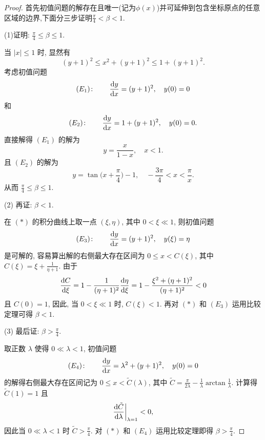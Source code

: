 \begin{proof}
  首先初值问题的解存在且唯一(记为$\phi(x)$)并可延伸到包含坐标原点的任意区域的边界,下面分三步证明$\frac{\pi}{4}<\beta<1$.

  (1)证明: $\frac{\pi}{4}\leq\beta\leq1$.

  当 $|x|\leq 1$ 时, 显然有
  \[(y+1)^2\leq x^2+(y+1)^2\leq1+(y+1)^2.\]
  考虑初值问题
  \[(E_1)\colon\qquad \frac{\mathop{}\!\mathrm{d} y}{\mathop{}\!\mathrm{d} x} = (y+1)^2,\quad y(0)=0\]
  和
  \[(E_2)\colon\qquad \frac{\mathop{}\!\mathrm{d} y}{\mathop{}\!\mathrm{d} x} = 1+(y+1)^2,\quad y(0)=0.\]
  直接解得 $(E_1)$ 的解为
  \[y = \frac{x}{1-x},\quad x<1.\]
  且 $(E_2)$ 的解为
  \[y = \tan\biggl(x+\frac{\pi}{4}\biggr) - 1,\quad -\frac{3\pi}{4} < x < \frac{\pi}{x}.\]
  从而 $\frac{\pi}{4} \leq \beta \leq 1$.

  (2) 再证: $\beta<1$.

  在 $(*)$ 的积分曲线上取一点 $(\xi,\eta)$, 其中 $0<\xi\ll 1$, 则初值问题
  \[(E_3)\colon\qquad \frac{\mathop{}\!\mathrm{d} y}{\mathop{}\!\mathrm{d} x} = (y+1)^2,\quad y(\xi) = \eta\]
  是可解的, 容易算出解的右侧最大存在区间为 $0\leq x < C(\xi)$,
  其中 $C(\xi) = \xi + \frac{1}{\eta+1}$. 由于
  \[\frac{\mathop{}\!\mathrm{d} C}{\mathop{}\!\mathrm{d}\xi} = 1 - \frac{1}{(\eta+1)^2}\frac{\mathop{}\!\mathrm{d}\eta}{\mathop{}\!\mathrm{d}\xi}
    = 1 - \frac{\xi^2+(\eta+1)^2}{(\eta+1)^2} < 0\]
  且 $C(0) = 1$, 因此, 当 $0 <\xi\ll 1$ 时, $C(\xi)<1$.
  再对 $(*)$ 和 $(E_3)$ 运用比较定理可得 $\beta<1$.

  (3) 最后证: $\beta>\frac{\pi}{4}$.

  取正数 $\lambda$ 使得 $0\ll\lambda < 1$, 初值问题
  \[(E_4)\colon\qquad \frac{\mathop{}\!\mathrm{d} y}{\mathop{}\!\mathrm{d} x} = \lambda^2 + (y+1)^2,\quad y(0) = 0\]
  的解得右侧最大存在区间记为 $0\leq x<\tilde{C}(\lambda)$,
  其中 $\tilde{C} = \frac{\pi}{2\lambda} - \frac{1}{\lambda} \arctan\frac{1}{\lambda}$.
  计算得 $\tilde{C}(1)=1$ 且
  \[\frac{\mathop{}\!\mathrm{d}\tilde{C}}{\mathop{}\!\mathrm{d}\lambda}\bigg|_{\lambda=1} < 0,\]
  因此当 $0\ll\lambda < 1$ 时 $\tilde{C}>\frac{\pi}{4}$.
  对 $(*)$ 和 $(E_4)$ 运用比较定理即得 $\beta>\frac{\pi}{4}$.
\end{proof}